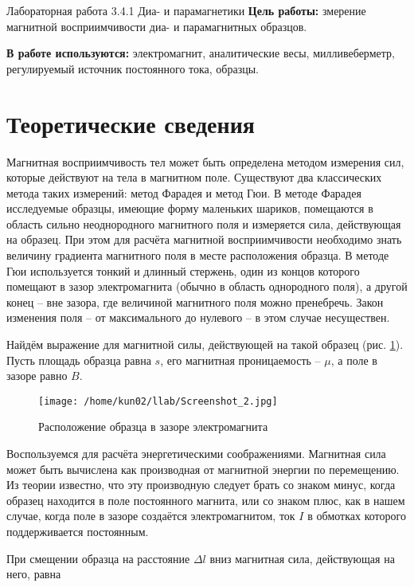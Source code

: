 \documentclass[a4paper]{article}
\begin{document}
	{\Large Лабораторная работа 3.4.1}
	\hfill \break
	\hfill \break
	\hfill \break
	{\LARGE Диа- и парамагнетики 
	}
	\hfill \break
	\hfill \break
	{\normalsize \textbf{Цель работы:}  змерение магнитной восприимчивости диа- и парамагнитных образцов.}
	
	\hfill \break
	\hfill \break
	{\normalsize \textbf{В работе используются:} электромагнит, аналитические весы, милливеберметр, регулируемый источник постоянного тока, образцы.
	}
	\hfill \break
	\hfill \break
	\section{Теоретические сведения}
Магнитная восприимчивость тел может быть определена методом измерения сил, которые действуют на тела в магнитном поле. Существуют два классических метода таких измерений: метод Фарадея и метод Гюи. В методе Фарадея исследуемые образцы, имеющие форму маленьких шариков, помещаются в область сильно неоднородного магнитного поля и измеряется сила, действующая на образец. При этом для расчёта магнитной восприимчивости необходимо знать величину градиента магнитного поля в месте расположения образца. В методе Гюи используется тонкий и длинный стержень, один из концов которого помещают в зазор электромагнита (обычно в область однородного поля), а другой конец -- вне зазора, где величиной магнитного поля можно пренебречь. Закон изменения поля -- от максимального до нулевого -- в этом случае несуществен.

Найдём выражение для магнитной силы, действующей на такой образец (рис. \ref{pic:2}). Пусть площадь образца равна $ s $, его магнитная проницаемость -- $ \mu $, а поле в зазоре равно $ B $.

\begin{figure}[h!]
	\centering
	\texttt{[image: /home/kun02/llab/Screenshot\_2.jpg]}
	\caption{Расположение образца в зазоре электромагнита}
	\label{pic:2}
\end{figure}

Воспользуемся для расчёта энергетическими соображениями. Магнитная сила может быть вычислена как производная от магнитной энергии по перемещению. Из теории известно, что эту производную следует брать со знаком минус, когда образец находится в поле постоянного магнита, или со знаком плюс, как в нашем случае, когда поле в зазоре создаётся электромагнитом, ток $ I $ в обмотках которого поддерживается постоянным.

При смещении образца на расстояние $ \Delta l $ вниз магнитная сила, действующая на него, равна
\end{document}
